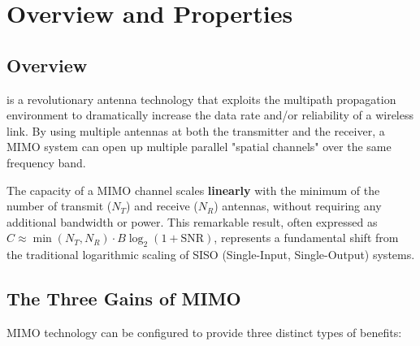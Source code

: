 \section{Overview and Properties}

\subsection{Overview}

 is a revolutionary antenna technology that exploits the multipath propagation environment to dramatically increase the data rate and/or reliability of a wireless link. By using multiple antennas at both the transmitter and the receiver, a MIMO system can open up multiple parallel "spatial channels" over the same frequency band.

\begin{keyconcept}
    The capacity of a MIMO channel scales \textbf{linearly} with the minimum of the number of transmit ($N_T$) and receive ($N_R$) antennas, without requiring any additional bandwidth or power. This remarkable result, often expressed as $C \approx \min(N_T, N_R) \cdot B \log_2(1 + \text{SNR})$, represents a fundamental shift from the traditional logarithmic scaling of SISO (Single-Input, Single-Output) systems.
\end{keyconcept}


\subsection{The Three Gains of MIMO}

MIMO technology can be configured to provide three distinct types of benefits:

